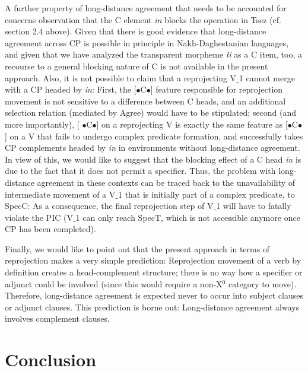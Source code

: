 \documentclass[output=paper
,modfonts
,nonflat]{langsci/langscibook}
\begin{document}
A further property of long-distance agreement that needs to be
accounted for concerns  observation
that the C element {\it \textcrlambda in} blocks the operation in Tsez
(cf. section 2.4 above). Given that there is good evidence that
long-distance agreement across CP is possible in principle in
Nakh-Daghestanian languages, and given that we have analyzed the
transparent morpheme {\it {\l}i} as a C item, too, a recourse to a
general blocking nature of C is not available in the present
approach. Also, it is not possible to claim that a reprojecting V$\_$1
cannot merge with a CP headed by {\it \textcrlambda in}: First, the
[{\small $\bullet$}C{\small $\bullet$}] feature responsible for
reprojection movement is not sensitive to a difference between C
heads, and an additional selection relation (mediated by Agree) would
have to be stipulated; second (and more importantly), [{\small
    $\bullet$}C{\small $\bullet$}] on a reprojecting V is exactly the
same feature as [{\small $\bullet$}C{\small $\bullet$}] on a V that
fails to undergo complex predicate formation, and successfully takes
CP complements headed by {\it \textcrlambda in} in environments
without long-distance agreement. In view of this, we would like to
suggest that the blocking effect of a C head {\it \textcrlambda in} is
due to the fact that it does not permit a specifier. Thus, the problem
with long-distance agreement in these contexts can be traced back to
the unavailability of intermediate movement of a V$\_$1 that is initially
part of a complex predicate, to SpecC: As a consequence, the final
reprojection step of V$\_$1 will have to fatally violate the PIC (V$\_$1
can only reach SpecT, which is not accessible anymore once CP has been
completed).

Finally, we would like to point out that the present approach in terms
of reprojection makes a very simple prediction: Reprojection movement
of a verb by definition creates a head-complement structure; there is
no way how a specifier or adjunct could be involved (since this would
require a non-X$^0$ category to move). Therefore, long-distance
agreement is expected never to occur into subject clauses or adjunct
clauses.  This prediction is borne out: Long-distance agreement always
involves complement clauses.


\section{Conclusion}
\end{document}
